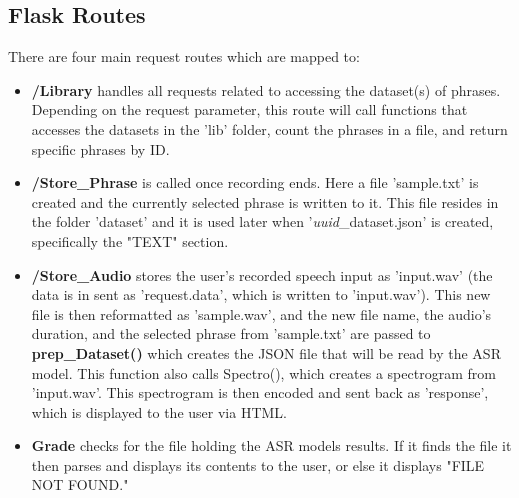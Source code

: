 \documentclass[12pt, letterpaper]{article}
\begin{document}
\subsection*{Flask Routes}
There are four main request routes which are mapped to:
\begin{itemize}
\item{\textbf{/Library}} handles all requests related to accessing the dataset(s) of phrases. Depending on the request parameter, this route will call functions that accesses the datasets in the 'lib' folder, count the phrases in a file, and return specific phrases by ID. 

\item{\textbf{/Store\_Phrase}} is called once recording ends. Here a file 'sample.txt' is created and the currently selected phrase is written to it. This file resides in the folder 'dataset' and it is used later when '\textit{uuid}_dataset.json' is created, specifically the "TEXT" section.

\item{\textbf{/Store\_Audio}} stores the user's recorded speech input as 'input.wav' (the data is in sent as 'request.data', which is written to 'input.wav'). This new file is then reformatted as 'sample.wav', and the new file name, the audio's duration, and the selected phrase from 'sample.txt' are passed to \textbf{prep\_Dataset()} which creates the JSON file that will be read by the ASR model.
This function also calls Spectro(), which creates a spectrogram from 'input.wav'. This spectrogram is then encoded and sent back as 'response', which is displayed to the user via HTML.

\item \textbf{Grade} checks for the file holding the ASR models results. If it finds the file it then parses and displays its contents to the user, or else it displays "FILE NOT FOUND."
\end{itemize}
\end{document}
